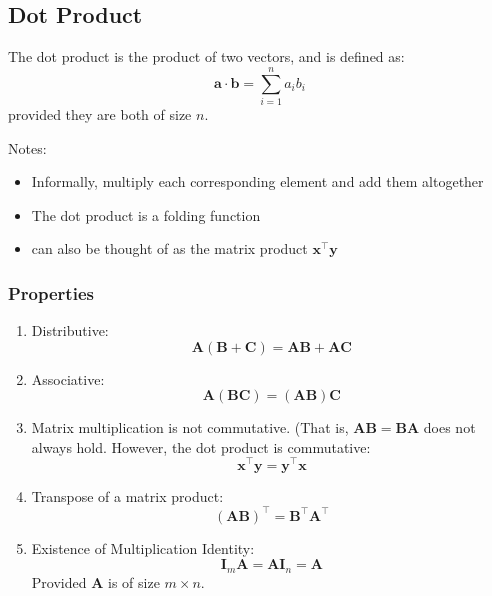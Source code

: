 \documentclass[11pt,twocolumn]{report}
\begin{document}
\subsection{Dot Product}
The dot product is the product of two vectors, and is defined as:
\begin{equation}
	\bm{a} \cdot \bm{b} = \sum_{i = 1}^n a_ib_i
\end{equation}
provided they are both of size $n$.\par
Notes:
\begin{itemize}
	\item Informally, multiply each corresponding element and add them altogether
	\item The dot product is a folding function
	\item can also be thought of as the matrix product $\bm{x}^\intercal\bm{y}$
\end{itemize}
\subsubsection{Properties}
\begin{enumerate}
	\item Distributive: 
		\begin{equation}
			\bm{A}(\bm{B} + \bm{C}) = \bm{AB} + \bm{AC}
		\end{equation}
	\item Associative:
		\begin{equation}
			\bm{A}(\bm{BC}) = (\bm{AB})\bm{C}
		\end{equation}
	\item Matrix multiplication is not commutative. (That is, $\bm{AB} = \bm{BA}$
		does not always hold. However, the dot product is commutative:
		\begin{equation}
			\bm{x}^\intercal\bm{y} = \bm{y}^\intercal\bm{x}
		\end{equation}
	\item Transpose of a matrix product:
		\begin{equation}
			(\bm{AB})^\intercal = \bm{B}^\intercal\bm{A}^\intercal
		\end{equation}
	\item Existence of Multiplication Identity:
		\begin{equation}
			\bm{I}_m\bm{A} = \bm{A}\bm{I}_n = \bm{A}
		\end{equation}
		Provided $\bm{A}$ is of size $m \times n$.
\end{enumerate}
\end{document}
